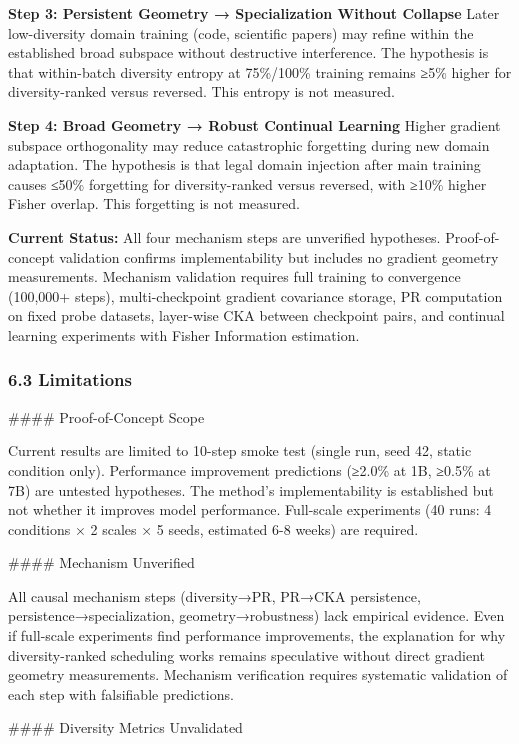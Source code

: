 \textbf{Step 3: Persistent Geometry → Specialization Without Collapse}
Later low-diversity domain training (code, scientific papers) may refine within the established broad subspace without destructive interference. The hypothesis is that within-batch diversity entropy at 75\%/100\% training remains ≥5\% higher for diversity-ranked versus reversed. This entropy is not measured.

\textbf{Step 4: Broad Geometry → Robust Continual Learning}
Higher gradient subspace orthogonality may reduce catastrophic forgetting during new domain adaptation. The hypothesis is that legal domain injection after main training causes ≤50\% forgetting for diversity-ranked versus reversed, with ≥10\% higher Fisher overlap. This forgetting is not measured.

\textbf{Current Status:} All four mechanism steps are unverified hypotheses. Proof-of-concept validation confirms implementability but includes no gradient geometry measurements. Mechanism validation requires full training to convergence (100,000+ steps), multi-checkpoint gradient covariance storage, PR computation on fixed probe datasets, layer-wise CKA between checkpoint pairs, and continual learning experiments with Fisher Information estimation.

\subsubsection{6.3 Limitations}

\#\#\#\# Proof-of-Concept Scope

Current results are limited to 10-step smoke test (single run, seed 42, static condition only). Performance improvement predictions (≥2.0\% at 1B, ≥0.5\% at 7B) are untested hypotheses. The method's implementability is established but not whether it improves model performance. Full-scale experiments (40 runs: 4 conditions × 2 scales × 5 seeds, estimated 6-8 weeks) are required.

\#\#\#\# Mechanism Unverified

All causal mechanism steps (diversity→PR, PR→CKA persistence, persistence→specialization, geometry→robustness) lack empirical evidence. Even if full-scale experiments find performance improvements, the explanation for why diversity-ranked scheduling works remains speculative without direct gradient geometry measurements. Mechanism verification requires systematic validation of each step with falsifiable predictions.

\#\#\#\# Diversity Metrics Unvalidated

